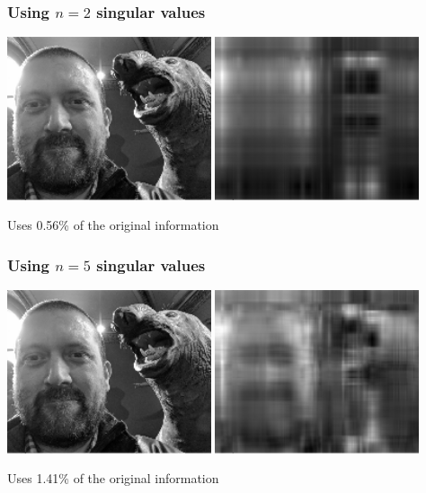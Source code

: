 \documentclass[aspectratio=169]{beamer}\usepackage[]{graphicx}\usepackage[]{xcolor}
\begin{document}
\begin{frame}\frametitle{Using $n=2$ singular values}
\begin{center}
\includegraphics[width=0.45\textwidth]{FIGS/matrix-methods-plot-image-svd-original-1.png}
\includegraphics[width=0.45\textwidth]{FIGS/matrix-methods-plot-image-svd-n2-1.png}
\end{center}
\vfill
Uses 0.56\% of the original information
\end{frame}



\begin{frame}\frametitle{Using $n=5$ singular values}
\begin{center}
\includegraphics[width=0.45\textwidth]{FIGS/matrix-methods-plot-image-svd-original-1.png}
\includegraphics[width=0.45\textwidth]{FIGS/matrix-methods-plot-image-svd-n5-1.png}
\end{center}
\vfill
Uses 1.41\% of the original information
\end{frame}
\end{document}
